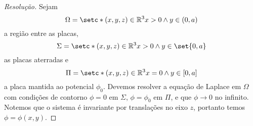 \begin{proof}[Resolução]
    Sejam
    \begin{equation*}
        \Omega = \setc*{(x,y,z) \in \mathbb{R}^3}{x > 0 \land y \in (0,a)}
    \end{equation*}
    a região entre as placas,
    \begin{equation*}
        \Sigma = \setc*{(x,y,z) \in \mathbb{R}^3}{x > 0 \land y \in \set{0,a}}
    \end{equation*}
    as placas aterradas e
    \begin{equation*}
        \Pi = \setc*{(x,y,z) \in \mathbb{R}^3}{x = 0 \land y \in [0,a]}
    \end{equation*}
    a placa mantida ao potencial \(\phi_0\). Devemos resolver a equação de Laplace em \(\Omega\) com condições de contorno \(\phi = 0\) em \(\Sigma\), \(\phi = \phi_0\) em \(\Pi\), e que \(\phi \to 0\) no infinito. Notemos que o sistema é invariante por translações no eixo \(z\), portanto temos \(\phi = \phi(x,y)\).


\end{proof}
